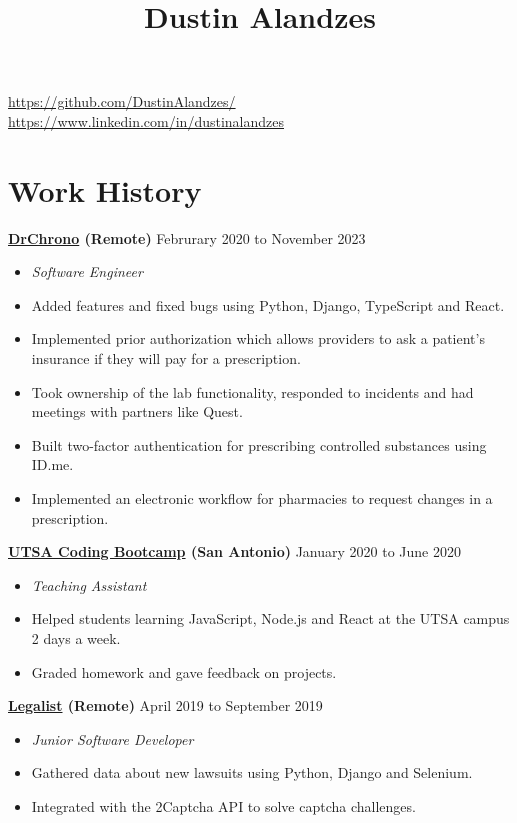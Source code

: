 \documentclass[10pt]{article}
\title{Dustin Alandzes}
\author{}
\date{}
\begin{document}
   \pagestyle{empty}
   \maketitle
   \thispagestyle{empty}

   \begin{center}
    \href{https://github.com/DustinAlandzes/}{https://github.com/DustinAlandzes/}
    \href{https://www.linkedin.com/in/dustinalandzes}{https://www.linkedin.com/in/dustinalandzes}
   \end{center}

   \section*{Work History}
   \textbf{\href{https://www.drchrono.com/}{DrChrono} (Remote)} \hfill {Februrary 2020 to November 2023}
   \begin{itemize}
     \item[] \textit{Software Engineer}
     \item[] Added features and fixed bugs using Python, Django, TypeScript and React.
     \item[] Implemented prior authorization which allows providers to ask a patient's insurance if they will pay for a prescription.
     \item[] Took ownership of the lab functionality, responded to incidents and had meetings with partners like Quest.
     \item[] Built two-factor authentication for prescribing controlled substances using ID.me.
     \item[] Implemented an electronic workflow for pharmacies to request changes in a prescription.
    \end{itemize}

   \textbf{\href{https://bootcamp.utsa.edu/coding/}{UTSA Coding Bootcamp} (San Antonio)} \hfill {January 2020 to June 2020}
    \begin{itemize}
     \item[] \textit{Teaching Assistant}
     \item[] Helped students learning JavaScript, Node.js and React at the UTSA campus 2 days a week.
     \item[] Graded homework and gave feedback on projects.
    \end{itemize}

     \textbf{\href{https://www.legalist.com/}{Legalist} (Remote)} \hfill {April 2019 to September 2019}
    \begin{itemize}
     \item[] \textit{Junior Software Developer}
     \item[] Gathered data about new lawsuits using Python, Django and Selenium.
     \item[] Integrated with the 2Captcha API to solve captcha challenges.
    \end{itemize}
\end{document}
